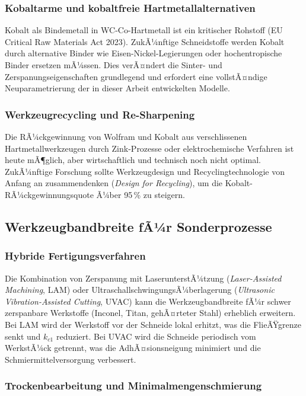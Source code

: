 ﻿\documentclass[a4paper,12pt]{article}
\theoremstyle{definition}
\begin{document}
\subsubsection{Kobaltarme und kobaltfreie Hartmetallalternativen}

Kobalt als Bindemetall in WC-Co-Hartmetall ist ein kritischer Rohstoff (EU
Critical Raw Materials Act 2023). ZukÃ¼nftige Schneidstoffe werden Kobalt
durch alternative Binder wie Eisen-Nickel-Legierungen oder hochentropische
Binder ersetzen mÃ¼ssen. Dies verÃ¤ndert die Sinter- und Zerspanungseigenschaften
grundlegend und erfordert eine vollstÃ¤ndige Neuparametrierung der in dieser
Arbeit entwickelten Modelle.

\subsubsection{Werkzeugrecycling und Re-Sharpening}

Die RÃ¼ckgewinnung von Wolfram und Kobalt aus verschlissenen Hartmetallwerkzeugen
durch Zink-Prozesse oder elektrochemische Verfahren ist heute mÃ¶glich, aber
wirtschaftlich und technisch noch nicht optimal. ZukÃ¼nftige Forschung sollte
Werkzeugdesign und Recyclingtechnologie von Anfang an zusammendenken
(\emph{Design for Recycling}), um die Kobalt-RÃ¼ckgewinnungsquote Ã¼ber 95\,\%
zu steigern.

\subsection{Werkzeugbandbreite fÃ¼r Sonderprozesse}

\subsubsection{Hybride Fertigungsverfahren}

Die Kombination von Zerspanung mit LaserunterstÃ¼tzung (\emph{Laser-Assisted
Machining}, LAM) oder UltraschallschwingungsÃ¼berlagerung
(\emph{Ultrasonic Vibration-Assisted Cutting}, UVAC) kann die
Werkzeugbandbreite fÃ¼r schwer zerspanbare Werkstoffe (Inconel, Titan,
gehÃ¤rteter Stahl) erheblich erweitern. Bei LAM wird der Werkstoff vor der
Schneide lokal erhitzt, was die FlieÃŸgrenze senkt und $k_{c1}$ reduziert.
Bei UVAC wird die Schneide periodisch vom WerkstÃ¼ck getrennt, was die
AdhÃ¤sionsneigung minimiert und die Schmiermittelversorgung verbessert.

\subsubsection{Trockenbearbeitung und Minimalmengenschmierung}
\end{document}
